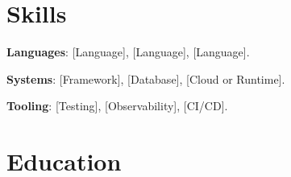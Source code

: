 \documentclass{resume}
\begin{document}
\section{Skills}
\begin{skillitems}
  \item \textbf{Languages}: [Language], [Language], [Language].
  \item \textbf{Systems}: [Framework], [Database], [Cloud or Runtime].
  \item \textbf{Tooling}: [Testing], [Observability], [CI/CD].
\end{skillitems}

\section{Education}


\end{document}
